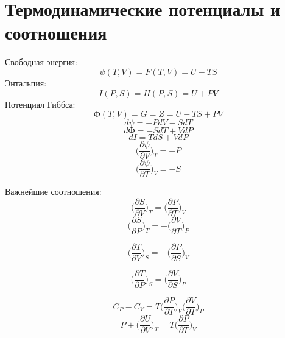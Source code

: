 \documentclass[12pt]{article}
\begin{document}
\section{Термодинамические потенциалы и соотношения}
Свободная энергия:
\begin{equation*}
\psi(T,V) = F(T,V) = U - TS 
\end{equation*}
Энтальпия:
\begin{equation*}
I(P,S) = H(P,S) = U + PV
\end{equation*}
Потенциал Гиббса:
\begin{equation*}
Ф(T,V) = G = Z = U - TS + PV
\end{equation*}
\begin{equation*}
d\psi = -PdV - SdT
\end{equation*}
\begin{equation*}
dФ = -SdT + VdP
\end{equation*}
\begin{equation*}
dI = TdS + VdP
\end{equation*}
\begin{equation*}
\bigg(\frac{\partial \psi}{\partial V}\bigg)_T = -P
\end{equation*}
\begin{equation*}
\bigg(\frac{\partial \psi}{\partial T}\bigg)_V = -S
\end{equation*}

Важнейшие соотношения:
\begin{equation*}
\bigg(\frac{\partial S}{\partial V}\bigg)_T = \bigg(\frac{\partial P}{\partial T}\bigg)_V
\end{equation*}
\begin{equation*}
\bigg(\frac{\partial S}{\partial P}\bigg)_T = -\bigg(\frac{\partial V}{\partial T}\bigg)_P
\end{equation*}

\begin{equation*}
\bigg(\frac{\partial T}{\partial V}\bigg)_S = -\bigg(\frac{\partial P}{\partial S}\bigg)_V
\end{equation*}

\begin{equation*}
\bigg(\frac{\partial T}{\partial P}\bigg)_S = \bigg(\frac{\partial V}{\partial S}\bigg)_P
\end{equation*}

\begin{equation*}
C_P - C_V = T\bigg(\frac{\partial P}{\partial T}\bigg)_V\bigg(\frac{\partial V}{\partial T}\bigg)_P
\end{equation*}
\begin{equation*}
P + \bigg(\frac{\partial U}{\partial V}\bigg)_T = T\bigg(\frac{\partial P}{\partial T}\bigg)_V
\end{equation*}
\end{document}
